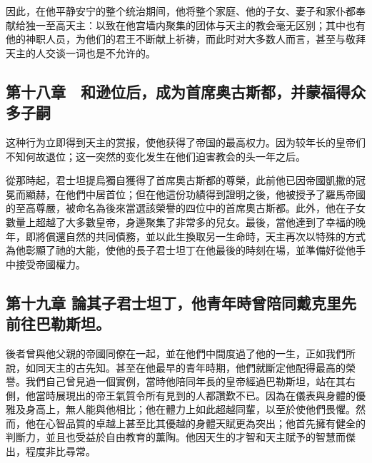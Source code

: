因此，在他平静安宁的整个统治期间，他将整个家庭、他的子女、妻子和家仆都奉献给独一至高天主：以致在他宫墙内聚集的团体与天主的教会毫无区别；其中也有他的神职人员，为他们的君王不断献上祈祷，而此时对大多数人而言，甚至与敬拜天主的人交谈一词也是不允许的。\par


\subsection{第十八章　和逊位后，成为首席奥古斯都，并蒙福得众多子嗣}

这种行为立即得到天主的赏报，使他获得了帝国的最高权力。因为较年长的皇帝们不知何故退位；这一突然的变化发生在他们迫害教会的头一年之后。\par

從那時起，君士坦提烏獨自獲得了首席奧古斯都的尊榮，此前他已因帝國凱撒的冠冕而顯赫，在他們中居首位；但在他這份功績得到證明之後，他被授予了羅馬帝國的至高尊嚴，被命名為後來當選該榮譽的四位中的首席奧古斯都。此外，他在子女數量上超越了大多數皇帝，身邊聚集了非常多的兒女。最後，當他達到了幸福的晚年，即將償還自然的共同債務，並以此生換取另一生命時，天主再次以特殊的方式為他彰顯了祂的大能，使他的長子君士坦丁在他最後的時刻在場，並準備好從他手中接受帝國權力。\par


\subsection{第十九章 論其子君士坦丁，他青年時曾陪同戴克里先前往巴勒斯坦。}

後者曾與他父親的帝國同僚在一起，並在他們中間度過了他的一生，正如我們所說，如同天主的古先知。甚至在他最早的青年時期，他們就斷定他配得最高的榮譽。我們自己曾見過一個實例，當時他陪同年長的皇帝經過巴勒斯坦，站在其右側，他當時展現出的帝王氣質令所有見到的人都讚歎不已。因為在儀表與身體的優雅及身高上，無人能與他相比；他在體力上如此超越同輩，以至於使他們畏懼。然而，他在心智品質的卓越上甚至比其優越的身體天賦更為突出；他首先擁有健全的判斷力，並且也受益於自由教育的薰陶。他因天生的才智和天主賦予的智慧而傑出，程度非比尋常。\par


